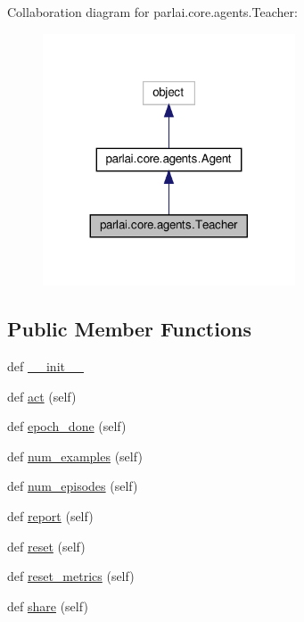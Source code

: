 Collaboration diagram for parlai.\+core.\+agents.\+Teacher\+:
\nopagebreak
\begin{figure}[H]
\begin{center}
\leavevmode
\includegraphics[width=212pt]{d8/d69/classparlai_1_1core_1_1agents_1_1Teacher__coll__graph}
\end{center}
\end{figure}
\subsection*{Public Member Functions}
\begin{DoxyCompactItemize}
\item 
def \hyperlink{classparlai_1_1core_1_1agents_1_1Teacher_a0ce9f4d0810bbd359c35572c05194167}{\+\_\+\+\_\+init\+\_\+\+\_\+}
\item 
def \hyperlink{classparlai_1_1core_1_1agents_1_1Teacher_a3f4cbdfdddddb8776ab665f5f7ee63d6}{act} (self)
\item 
def \hyperlink{classparlai_1_1core_1_1agents_1_1Teacher_a4a2eda53b7b26f114ae3149b60f57845}{epoch\+\_\+done} (self)
\item 
def \hyperlink{classparlai_1_1core_1_1agents_1_1Teacher_a93370e4e99236e8ad267b40cd4437920}{num\+\_\+examples} (self)
\item 
def \hyperlink{classparlai_1_1core_1_1agents_1_1Teacher_aa35e171610f8dd8e6a2fd5a87ad91e10}{num\+\_\+episodes} (self)
\item 
def \hyperlink{classparlai_1_1core_1_1agents_1_1Teacher_aa0afab11fb5f3f26ac59576f064623a4}{report} (self)
\item 
def \hyperlink{classparlai_1_1core_1_1agents_1_1Teacher_a3b1fe4cf4ea53c9b2ce28435391ad081}{reset} (self)
\item 
def \hyperlink{classparlai_1_1core_1_1agents_1_1Teacher_a3f14618f0f49c57a6fbcb4f80f8a1de4}{reset\+\_\+metrics} (self)
\item 
def \hyperlink{classparlai_1_1core_1_1agents_1_1Teacher_a43cf8d0b49ef4ff150ceef0149c063c3}{share} (self)
\end{DoxyCompactItemize}
